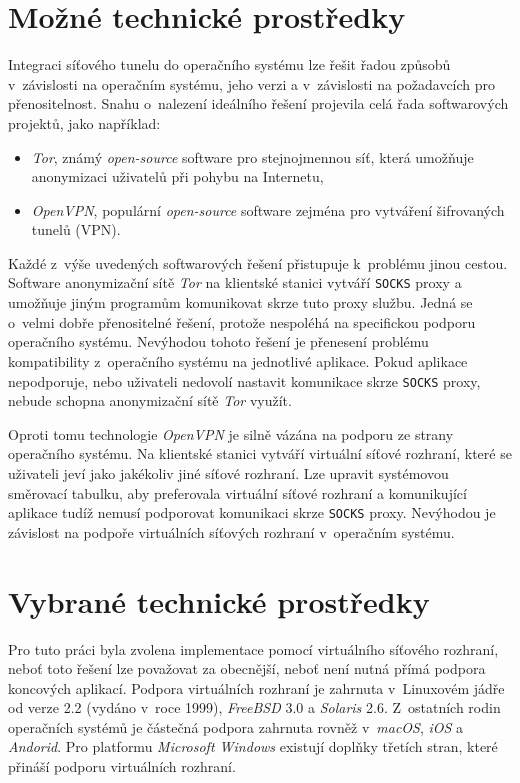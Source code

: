 \documentclass[thesis=M,czech]{FITthesis}[2012/10/20]
\begin{document}
\section{Možné technické prostředky}

Integraci síťového tunelu do operačního systému lze řešit řadou způsobů v~závislosti na operačním systému, jeho verzi a v~závislosti na požadavcích pro přenositelnost. Snahu o~nalezení ideálního řešení projevila celá řada softwarových projektů, jako například:

\begin{itemize}
 \item \textit{Tor}, známý \textit{open-source} software pro stejnojmennou síť, která umožňuje anonymizaci uživatelů při pohybu na Internetu,
 \item \textit{OpenVPN}, populární \textit{open-source} software zejména pro vytváření šifrovaných tunelů (VPN).
\end{itemize}

Každé z~výše uvedených softwarových řešení přistupuje k~problému jinou cestou. Software anonymizační sítě \textit{Tor} na klientské stanici vytváří \texttt{SOCKS} proxy a umožňuje jiným programům komunikovat skrze tuto proxy službu. Jedná se o~velmi dobře přenositelné řešení, protože nespoléhá na specifickou podporu operačního systému. Nevýhodou tohoto řešení je přenesení problému kompatibility z~operačního systému na jednotlivé aplikace. Pokud aplikace nepodporuje, nebo uživateli nedovolí nastavit komunikace skrze \texttt{SOCKS} proxy, nebude schopna anonymizační sítě \textit{Tor} využít.

Oproti tomu technologie \textit{OpenVPN} je silně vázána na podporu ze strany operačního systému. Na klientské stanici vytváří virtuální síťové rozhraní, které se uživateli jeví jako jakékoliv jiné síťové rozhraní. Lze upravit systémovou směrovací tabulku, aby preferovala virtuální síťové rozhraní a komunikující aplikace tudíž nemusí podporovat komunikaci skrze \texttt{SOCKS} proxy. Nevýhodou je závislost na podpoře virtuálních síťových rozhraní v~operačním systému.

\section{Vybrané technické prostředky}

Pro tuto práci byla zvolena implementace pomocí virtuálního síťového rozhraní, neboť toto řešení lze považovat za obecnější, neboť není nutná přímá podpora koncových aplikací. Podpora virtuálních rozhraní je zahrnuta v~Linuxovém jádře od verze 2.2 (vydáno v~roce 1999), \textit{FreeBSD} 3.0 a \textit{Solaris} 2.6. Z~ostatních rodin operačních systémů je částečná podpora zahrnuta rovněž v~\textit{macOS}, \textit{iOS} a \textit{Andorid}. Pro platformu \textit{Microsoft Windows} existují doplňky třetích stran, které přináší podporu virtuálních rozhraní.
\end{document}
